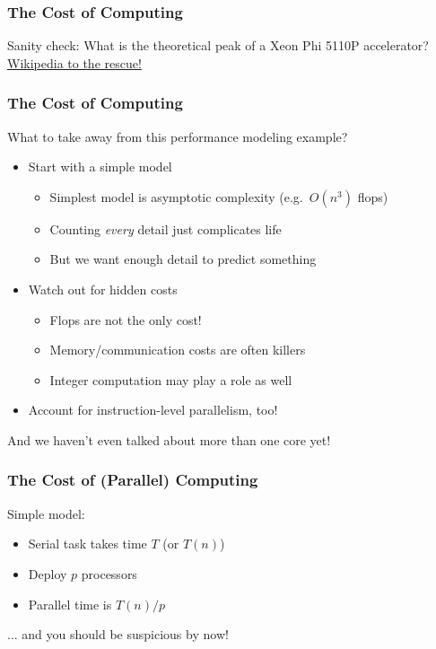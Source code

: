 \documentclass{beamer}
\begin{document}
\begin{frame}
  \frametitle{The Cost of Computing}

  Sanity check: What is the theoretical peak of a Xeon Phi 5110P
  accelerator? \\
  \hfill \href{https://en.wikipedia.org/wiki/Xeon_Phi}{Wikipedia to the rescue!}
\end{frame}


\begin{frame}
  \frametitle{The Cost of Computing}

  What to take away from this performance modeling example?
  \begin{itemize}
  \item Start with a simple model
    \begin{itemize}
    \item Simplest model is asymptotic complexity (e.g.~$O(n^3)$ flops)
    \item Counting {\em every} detail just complicates life
    \item But we want enough detail to predict something
    \end{itemize}
  \item Watch out for hidden costs
    \begin{itemize}
    \item Flops are not the only cost!
    \item Memory/communication costs are often killers
    \item Integer computation may play a role as well
    \end{itemize}
  \item Account for instruction-level parallelism, too!
  \end{itemize}
  And we haven't even talked about more than one core yet!
\end{frame}


\begin{frame}
  \frametitle{The Cost of (Parallel) Computing}

  Simple model:
  \begin{itemize}
  \item Serial task takes time $T$ (or $T(n)$)
  \item Deploy $p$ processors
  \item Parallel time is $T(n)/p$
  \end{itemize}
  ... and you should be suspicious by now!
  
\end{frame}
\end{document}
